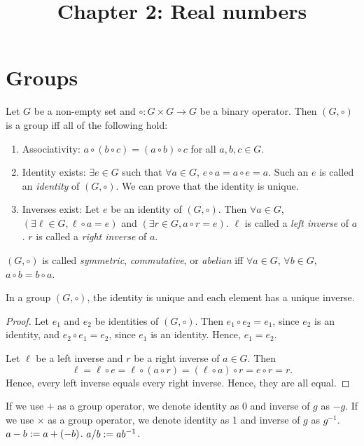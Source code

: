 \documentclass[a4paper, 12pt, fleqn]{article}
\author{\empty}
\date{\empty}
\title{Chapter 2: Real numbers}
\begin{document}
\maketitle
\setlength{\parskip}{0.2em}

\section{Groups}

\begin{definition}[Group]
Let $G$ be a non-empty set and $\circ: G \times G \to G$ be a binary operator.
Then $(G, \circ)$ is a group iff all of the following hold:
\begin{enumerate}
\item Associativity: $a \circ (b \circ c) = (a \circ b) \circ c$ for all $a, b, c \in G$.
\item Identity exists: $\exists e \in G$ such that $\forall a \in G$, $e \circ a = a \circ e = a$.
    Such an $e$ is called an \emph{identity} of $(G, \circ)$.
    We can prove that the identity is unique.
\item Inverses exist: Let $e$ be an identity of $(G, \circ)$. Then $\forall a \in G$,
    $(\exists \ell \in G, \ell \circ a = e)$ and $(\exists r \in G, a \circ r = e)$.
    $\ell$ is called a \emph{left inverse} of $a$. $r$ is called a \emph{right inverse} of $a$.
\end{enumerate}
$(G, \circ)$ is called \emph{symmetric}, \emph{commutative}, or \emph{abelian} iff
$\forall a \in G$, $\forall b \in G$, $a \circ b = b \circ a$.
\end{definition}

\begin{lemma}
In a group $(G, \circ)$, the identity is unique and each element has a unique inverse.
\end{lemma}
\begin{proof}
Let $e_1$ and $e_2$ be identities of $(G, \circ)$.
Then $e_1 \circ e_2 = e_1$, since $e_2$ is an identity, and $e_2 \circ e_1 = e_2$, since $e_1$ is an identity.
Hence, $e_1 = e_2$.

Let $\ell$ be a left inverse and $r$ be a right inverse of $a \in G$. Then
\[ \ell = \ell \circ e = \ell \circ (a \circ r) = (\ell \circ a) \circ r = e \circ r = r. \]
Hence, every left inverse equals every right inverse. Hence, they are all equal.
\end{proof}

\begin{definition}
If we use $+$ as a group operator, we denote identity as 0 and inverse of $g$ as $-g$.
If we use $\times$ as a group operator, we denote identity as 1 and inverse of $g$ as $g^{-1}$.
$a - b := a + (-b)$. $a / b := ab^{-1}$.
\end{definition}
\end{document}
